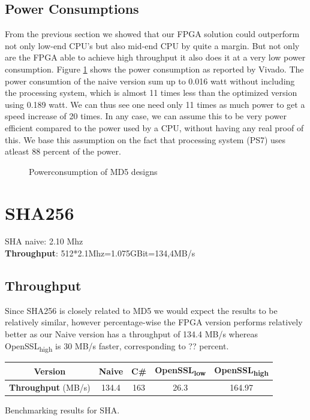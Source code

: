 \documentclass[a4paper, openany]{book}
\begin{document}
\subsection{Power Consumptions}
\label{sec:orgb04190e}
From the previous section we showed that our FPGA solution could outperform not only low-end CPU's but also mid-end CPU by quite a margin. But not only are the FPGA able to achieve high throughput it also does it at a very low power consumption. Figure \ref{fig:md5_naive_power} shows the power consumption as reported by Vivado. The power consumtion of the naive version sum up to 0.016 watt without including the processing system, which is almost 11 times less than the optimized version using 0.189 watt. We can thus see one need only 11 times as much power to get a speed increase of 20 times. In any case, we can assume this to be very power efficient compared to the power used by a CPU, without having any real proof of this. We base this assumption on the fact that processing system (PS7) uses atleast 88 percent of the power.
\begin{figure}[H]
\centering
{}
\caption[Power consumption of MD5 designs]%
{Powerconsumption of MD5 designs}
\label{fig:md5_naive_power}
\end{figure}
\section{SHA256}
\label{sec:org815a0fd}
SHA naive: 2.10 Mhz\\
\textbf{Throughput}: 512*2.1Mhz=1.075GBit=134,4MB/s
\subsection{Throughput}
\label{sec:org6432152}
Since SHA256 is closely related to MD5 we would expect the results to be relatively similar, however percentage-wise the FPGA version performs relatively better as our Naive version has a throughput of 134.4 MB/s whereas OpenSSL\textsubscript{high} is 30 MB/s faster, corresponding to ?? percent.
\begin{table}[htbp]
\centering
\begin{tabular}{|c|c|c|c|c|}
\hline
\textbf{Version} & Naive & C\# & OpenSSL\textsubscript{low} & OpenSSL\textsubscript{high}\\
\hline
\textbf{Throughput} (MB/s) & 134.4 & 163 & 26.3 & 164.97\\
\hline
\end{tabular}
Benchmarking results for SHA.

\end{table}
\end{document}
